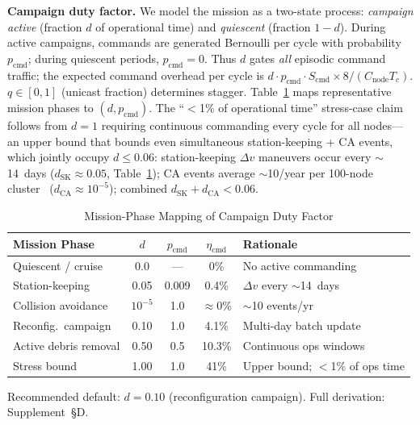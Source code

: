 \documentclass[journal]{IEEEtran}
\begin{document}
\textbf{Campaign duty factor.} We model the mission as a two-state process: \emph{campaign active} (fraction $d$ of operational time) and \emph{quiescent} (fraction $1 - d$). During active campaigns, commands are generated Bernoulli per cycle with probability $p_{\text{cmd}}$; during quiescent periods, $p_{\text{cmd}} = 0$. Thus $d$ gates \emph{all} episodic command traffic; the expected command overhead per cycle is $d \cdot p_{\text{cmd}} \cdot S_{\text{cmd}} \times 8 / (C_{\text{node}} T_c)$. $q \in [0,1]$ (unicast fraction) determines stagger. Table~\ref{tab:mission_phase_d} maps representative mission phases to $(d, p_{\text{cmd}})$. The ``$<$1\% of operational time'' stress-case claim follows from $d = 1$ requiring continuous commanding every cycle for all nodes---an upper bound that bounds even simultaneous station-keeping + CA events, which jointly occupy $d \leq 0.06$: station-keeping $\Delta v$ maneuvers occur every ${\sim}$14~days ($d_{\text{SK}} \approx 0.05$, Table~\ref{tab:mission_phase_d}); CA events average ${\sim}$10/year per 100-node cluster~\cite{esa_space_env} ($d_{\text{CA}} \approx 10^{-5}$); combined $d_{\text{SK}} + d_{\text{CA}} < 0.06$.

\begin{table}[t]
    \centering
    \caption{Mission-Phase Mapping of Campaign Duty Factor}
    \label{tab:mission_phase_d}
    \footnotesize
    \begin{tabular}{@{}lcccl@{}}
        \toprule
        \textbf{Mission Phase} & $d$ & $p_{\text{cmd}}$ & $\eta_{\text{cmd}}$ & \textbf{Rationale} \\
        \midrule
        Quiescent / cruise & 0.0 & --- & 0\% & No active commanding \\
        Station-keeping & 0.05 & 0.009 & 0.4\% & $\Delta v$ every ${\sim}$14~days \\
        Collision avoidance & $10^{-5}$ & 1.0 & $\approx$0\% & ${\sim}$10 events/yr \\
        Reconfig.\ campaign & 0.10 & 1.0 & 4.1\% & Multi-day batch update \\
        Active debris removal & 0.50 & 0.5 & 10.3\% & Continuous ops windows \\
        Stress bound & 1.00 & 1.0 & 41\% & Upper bound; $<$1\% of ops time \\
        \bottomrule
    \end{tabular}
\end{table}

\noindent Recommended default: $d = 0.10$ (reconfiguration campaign). Full derivation: Supplement~\S D.
\end{document}
